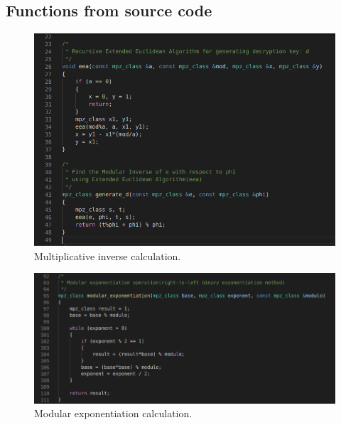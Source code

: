 \documentclass[11 pt]{article}
\begin{document}
\begin{appendices}

\section{Functions from source code}
\begin{figure}[H]
    \centering
    \includegraphics[width=1\linewidth]{multiplicative_inverse_calculation.png}
    \caption{Multiplicative inverse calculation.}
    \label{fig:multiplicative-inverse-calculation}
\end{figure}
\begin{figure}[H]
    \centering
    \includegraphics[width=1\linewidth]{modular_exponentiation_calculation.png}
    \caption{Modular exponentiation calculation.}
    \label{fig:modular-exponentiation-calculation}
\end{figure}
\label{appendix:source-code-functions}

\end{appendices}
\end{document}
